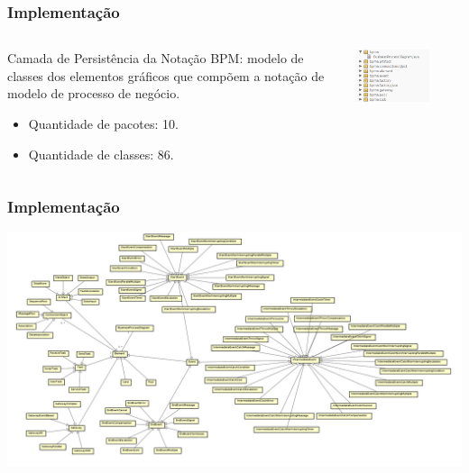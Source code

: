\documentclass[aspectratio=169]{beamer}
\begin{document}
\begin{frame}
\frametitle{Implementação}
\justifying

\begin{columns}
\begin{column}{0.5\textwidth}

Camada de Persistência da Notação BPM: modelo de classes dos elementos gráficos que compõem a notação de modelo de processo de negócio.\\
\begin{itemize}
\item Quantidade de pacotes: 10.
\item Quantidade de classes: 86.
\end{itemize}
   
\end{column}
\begin{column}{0.5\textwidth} 
    \begin{center}
     \includegraphics[width=0.7\textwidth]{pacote-bpmn.png}
     \end{center}
\end{column}
\end{columns}

\end{frame}

\begin{frame}
\frametitle{Implementação}
\justifying

\begin{center}
\includegraphics[width=.85\textwidth]{diagrama-classes-bpmn.png}
\end{center}

\end{frame}
\end{document}
